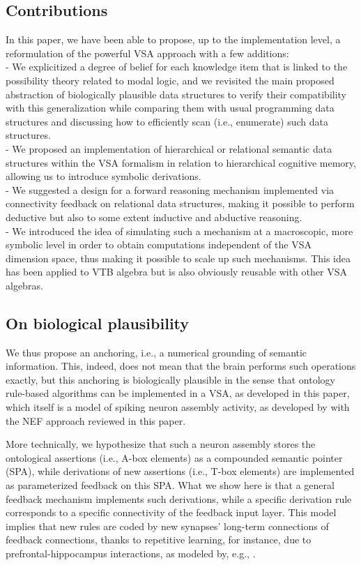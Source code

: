 \documentclass[sn-mathphys]{sn-jnl}
\begin{document}
\subsection{Contributions}

In this paper, we have been able to propose, up to the implementation level, a reformulation of the powerful VSA approach with a few additions:
\\- We explicitized a degree of belief for each knowledge item that is linked to the possibility theory related to modal logic, and we revisited the main proposed abstraction of biologically plausible data structures to verify their compatibility with this generalization while comparing them with usual programming data structures and discussing how to efficiently scan (i.e., enumerate) such data structures.
\\- We proposed an implementation of hierarchical or relational semantic data structures within the VSA formalism in relation to hierarchical cognitive memory, allowing us to introduce symbolic derivations.
\\- We suggested a design for a forward reasoning mechanism implemented via connectivity feedback on relational data structures, making it possible to perform deductive but also to some extent inductive and abductive reasoning.
\\- We introduced the idea of simulating such a mechanism at a macroscopic, more symbolic level in order to obtain computations independent of the VSA dimension space, thus making it possible to scale up such mechanisms. This idea has been applied to VTB algebra but is also obviously reusable with other VSA algebras.

\subsection{On biological plausibility}

We thus propose an anchoring, i.e., a numerical grounding of semantic information. This, indeed, does not mean that the brain performs such operations exactly, but this anchoring is biologically plausible in the sense that ontology rule-based algorithms can be implemented in a VSA, as developed in this paper, which itself is a model of spiking neuron assembly activity, as developed by \cite{eliasmith_how_2013} with the NEF approach reviewed in this paper.

More technically, we hypothesize that such a neuron assembly stores the ontological assertions (i.e., A-box elements) as a compounded semantic pointer (SPA), while derivations of new assertions (i.e., T-box elements) are implemented as parameterized feedback on this SPA. What we show here is that a general feedback mechanism implements such derivations, while a specific derivation rule corresponds to a specific connectivity of the feedback input layer.
This model implies that new rules are coded by new synapses' long-term connections of feedback connections, thanks to repetitive learning, for instance, due to prefrontal-hippocampus interactions, as modeled by, e.g., \cite{spens_generative_2023}.
\end{document}
